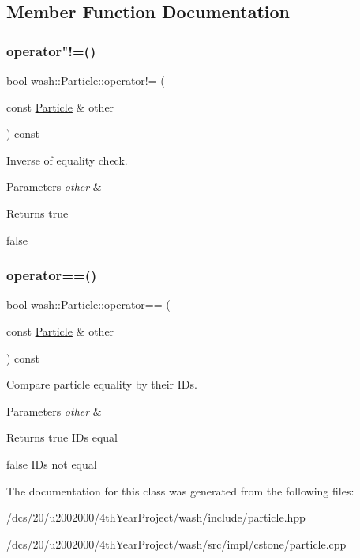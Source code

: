 \subsection{Member Function Documentation}
\mbox{\label{classwash_1_1Particle_a32f1334a8a0b273a57355956d7e9fe63}} 
\subsubsection{\texorpdfstring{operator"!=()}{operator!=()}}
{\footnotesize\ttfamily bool wash\+::\+Particle\+::operator!= (\begin{DoxyParamCaption}\item[{const \mbox{\hyperlink{classwash_1_1Particle}{Particle}} \&}]{other }\end{DoxyParamCaption}) const}



Inverse of equality check. 


\begin{DoxyParams}{Parameters}
{\em other} & \\
\hline
\end{DoxyParams}
\begin{DoxyReturn}{Returns}
true 

false 
\end{DoxyReturn}
\mbox{\label{classwash_1_1Particle_a32369e6edba4277ebc71917a37c2503d}} 
\subsubsection{\texorpdfstring{operator==()}{operator==()}}
{\footnotesize\ttfamily bool wash\+::\+Particle\+::operator== (\begin{DoxyParamCaption}\item[{const \mbox{\hyperlink{classwash_1_1Particle}{Particle}} \&}]{other }\end{DoxyParamCaption}) const}



Compare particle equality by their I\+Ds. 


\begin{DoxyParams}{Parameters}
{\em other} & \\
\hline
\end{DoxyParams}
\begin{DoxyReturn}{Returns}
true ID\textquotesingle{}s equal 

false ID\textquotesingle{}s not equal 
\end{DoxyReturn}


The documentation for this class was generated from the following files\+:\begin{DoxyCompactItemize}
\item 
/dcs/20/u2002000/4th\+Year\+Project/wash/include/particle.\+hpp\item 
/dcs/20/u2002000/4th\+Year\+Project/wash/src/impl/cstone/particle.\+cpp\end{DoxyCompactItemize}
